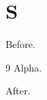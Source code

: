 \documentclass{article}
\begin{document}
\section{S}
Before.

\parbox{\textwidth}{\begin{thebibliography}{9} Alpha.\end{thebibliography}}

After.
\end{document}
